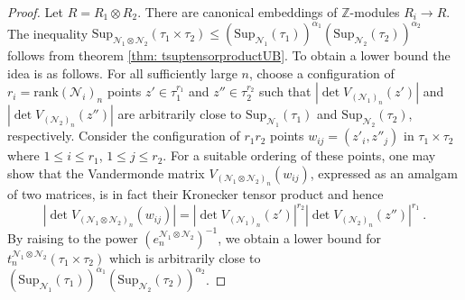 \documentclass[a4paper,10pt]{amsart}
\theoremstyle{definition}
\theoremstyle{remark}
\numberwithin{equation}{section}
\newcommand{\Z}{\mathbb Z}
\newcommand{\ts}{\mathrm{Sup}}
\newcommand{\rank}{\mathrm{rank}}
\newcommand{\0}{\color{blue}{\mathsf{0}}}
\begin{document}
 \begin{proof} Let $R= R_1 \otimes R_2$. There are canonical embeddings of $\Z$-modules $R_i \rightarrow R$. 
 The inequality  $ \ts_{\mathcal{N}_1 \otimes \mathcal{N}_2} (\tau_1 \times \tau_2)  \leq \left(\ts_{\mathcal{N}_1}(\tau_1)\right)^{\alpha_1}    \left(\ts_{\mathcal{N}_2}(\tau_2) \right)^{\alpha_2} $
 follows from theorem \ref{thm: tsuptensorproductUB}.
 To obtain a lower bound  the idea is as follows. For all sufficiently large $n$,  choose a configuration of $r_i=\rank (\mathcal{N}_i)_n$ points $z' \in \tau_1^{r_1} $ 
 and $z'' \in \tau_2^{r_2}$ such that $|\det V_{(\mathcal{N}_1)_n}(z')|$ and $|\det V_{(\mathcal{N}_2)_n}(z'')|$ are arbitrarily close to $\ts_{\mathcal{N}_1}(\tau_1)$ and $\ts_{\mathcal{N}_2}(\tau_2)$, respectively. Consider the configuration of  $r_1r_2$ points $w_{ij}=(z'_i, z''_j)$ in $\tau_1 \times \tau_2$ where $1\leq i \leq r_1$, $1\leq j \leq r_2$. For a suitable ordering of these points, one may show \cite[\S3.2,\S6]{BrVdM}  that the Vandermonde matrix $V_{(\mathcal{N}_1\otimes \mathcal{N}_2)_n} (w_{ij}) $, expressed as an amalgam of two matrices, is in fact their  Kronecker tensor product and hence 
 \[ |\det V_{(\mathcal{N}_1\otimes \mathcal{N}_2)_n} (w_{ij})| = 
 \left| \det V_{(\mathcal{N}_1)_n}(z') \right|^{r_2}  \left|\det V_{(\mathcal{N}_2)_n}(z'')\right|^{r_1} \ . \]
 By raising to the power $(e_n^{\mathcal{N}_1 \otimes \mathcal{N}_2})^{-1}$, we obtain a lower bound for  $t_n^{\mathcal{N}_1\otimes \mathcal{N}_2}(\tau_1\times \tau_2)$ which is arbitrarily close to  $\left(\ts_{\mathcal{N}_1}(\tau_1)\right)^{\alpha_1}    \left(\ts_{\mathcal{N}_2}(\tau_2) \right)^{\alpha_2}$.
  \end{proof} 
 
\end{document}

